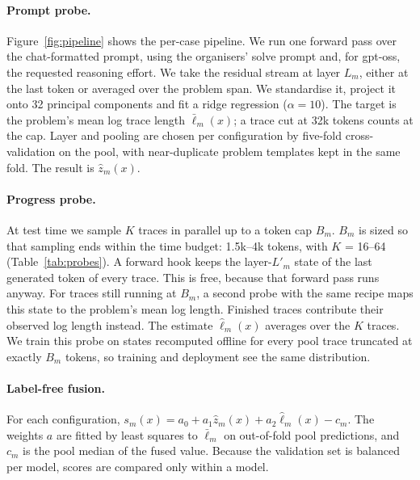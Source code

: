 \documentclass{article}
\begin{document}
\paragraph{Prompt probe.}
Figure~\ref{fig:pipeline} shows the per-case pipeline.
We run one forward pass over the chat-formatted prompt, using the organisers' solve prompt and, for gpt-oss, the requested reasoning effort.
We take the residual stream at layer $L_m$, either at the last token or averaged over the problem span.
We standardise it, project it onto 32 principal components and fit a ridge regression ($\alpha = 10$).
The target is the problem's mean log trace length $\bar\ell_m(x)$; a trace cut at 32k tokens counts at the cap.
Layer and pooling are chosen per configuration by five-fold cross-validation on the pool, with near-duplicate problem templates kept in the same fold.
The result is $\hat z_m(x)$.

\paragraph{Progress probe.}
At test time we sample $K$ traces in parallel up to a token cap $B_m$. $B_m$ is sized so that sampling ends within the time budget: 1.5k--4k tokens, with $K$ = 16--64 (Table~\ref{tab:probes}).
A forward hook keeps the layer-$L'_m$ state of the last generated token of every trace. This is free, because that forward pass runs anyway.
For traces still running at $B_m$, a second probe with the same recipe maps this state to the problem's mean log length.
Finished traces contribute their observed log length instead.
The estimate $\hat\ell_m(x)$ averages over the $K$ traces.
We train this probe on states recomputed offline for every pool trace truncated at exactly $B_m$ tokens, so training and deployment see the same distribution.

\paragraph{Label-free fusion.}
For each configuration, $s_m(x) = a_0 + a_1 \hat z_m(x) + a_2 \hat\ell_m(x) - c_m$.
The weights $a$ are fitted by least squares to $\bar\ell_m$ on out-of-fold pool predictions, and $c_m$ is the pool median of the fused value.
Because the validation set is balanced per model, scores are compared only within a model.
\end{document}
